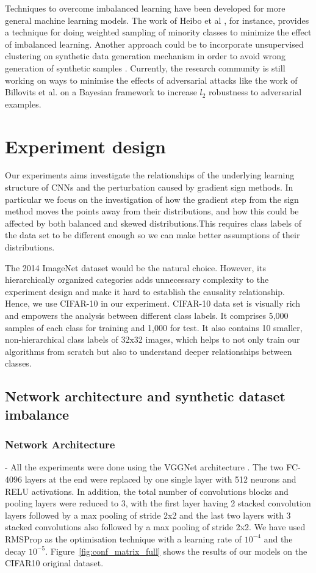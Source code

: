 \documentclass[runningheads,a4paper]{llncs}
\begin{document}
Techniques to overcome imbalanced learning have been developed for more general machine learning models. The work of Heibo et al \cite{he2008adasyn}, for instance, provides a technique for doing weighted sampling of minority classes to minimize the effect of imbalanced learning. Another approach could be to incorporate unsupervised clustering on synthetic data generation mechanism in order to avoid wrong generation of synthetic samples \cite{Barua2011}. Currently, the research community is still working on ways to minimise the effects of adversarial attacks like the work of Billovits et al. \cite{billovits} on a Bayesian framework to increase $l_2$ robustness to adversarial examples.

\section{Experiment design}

Our experiments aims investigate the relationships of the underlying learning structure of CNNs and the perturbation caused by gradient sign methods. In particular we focus on the investigation of how the gradient step from the sign method moves the points away from their distributions, and how this could be affected by both balanced and skewed distributions.This requires  class labels of the data set to be different enough so we can make better assumptions of their distributions. 

The 2014 ImageNet dataset \cite{deng2009imagenet} would be the natural choice. However, its hierarchically organized categories adds unnecessary complexity to the experiment design and make it hard to establish the causality relationship. Hence, we use  CIFAR-10 in our experiment. CIFAR-10 data set is visually rich and empowers the analysis between different class labels. It comprises 5,000 samples of each class for training and 1,000 for test. It also contains 10 smaller, non-hierarchical class labels of 32x32 images, which helps to not only train our algorithms from scratch but also to understand deeper relationships between classes.
\subsection{Network architecture and synthetic dataset imbalance}

\subsubsection{Network Architecture} - All the experiments were done using the VGGNet architecture \cite{simonyan2014very}. The two FC-4096 layers at the end were replaced by one single layer with 512 neurons and RELU activations. In addition, the total number of convolutions blocks and pooling layers were reduced to 3, with the first layer having 2 stacked convolution layers followed by a max pooling of stride 2x2 and the last two layers with 3 stacked convolutions also followed by a max pooling of stride 2x2. We have used RMSProp  \cite{bengiormsprop} as the optimisation technique with a learning rate of $10^{-4}$ and the decay $10^{-5}$. Figure~\ref{fig:conf_matrix_full} shows the results of our models on the CIFAR10 original dataset.
\end{document}
